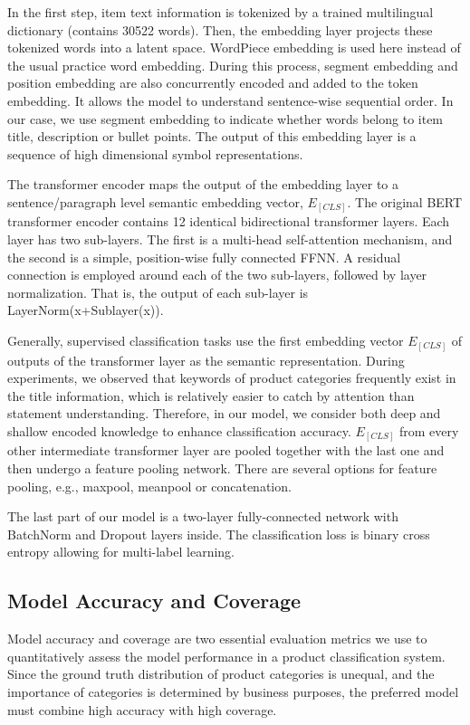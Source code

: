 \documentclass[11pt,dvipsnames]{article}
\begin{document}
In the first step, item text information is tokenized by a trained multilingual dictionary (contains 30522 words). Then, the embedding layer projects these tokenized words into a latent space. WordPiece embedding is used here instead of the usual practice word embedding. During this process, segment embedding and position embedding are also concurrently encoded and added to the token embedding. It allows the model to understand sentence-wise sequential order. In our case, we use segment embedding to indicate whether words belong to item title, description or bullet points. The output of this embedding layer is a sequence of high dimensional symbol representations.

The transformer encoder maps the output of the embedding layer to a sentence/paragraph level semantic embedding vector, $E_{[CLS]}$. The original BERT transformer encoder contains 12 identical bidirectional transformer layers. Each layer has two sub-layers. The first is a multi-head self-attention mechanism, and the second is a simple, position-wise fully connected FFNN. A residual connection is employed around each of the two sub-layers, followed by layer normalization. That is, the output of each sub-layer is LayerNorm(x+Sublayer(x)). 

 Generally, supervised classification tasks use the first embedding vector $E_{[CLS]}$ of outputs of the transformer layer as the semantic representation. During experiments, we observed that keywords of product categories frequently exist in the title information, which is relatively easier to catch by attention than statement understanding. Therefore, in our model, we consider both deep and shallow encoded knowledge to enhance classification accuracy. $E_{[CLS]}$ from every other intermediate transformer layer are pooled together with the last one and then undergo a feature pooling network. There are several options for feature pooling, e.g., maxpool, meanpool or concatenation. 


The last part of our model is a two-layer fully-connected network with BatchNorm and Dropout layers inside. The classification loss is binary cross entropy allowing for multi-label learning.

\subsection{Model Accuracy and Coverage}
Model accuracy and coverage are two essential evaluation metrics we use to quantitatively assess the model performance in a product classification system. Since the ground truth distribution of product categories is unequal, and the importance of categories is determined by business purposes, the preferred model must combine high accuracy with high coverage. 
\end{document}
